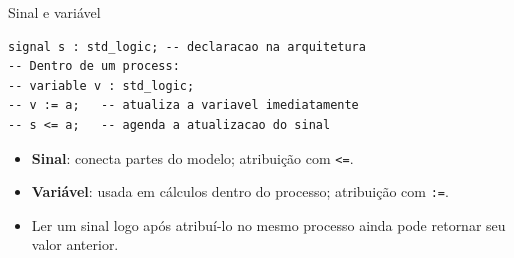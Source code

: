 \begin{frame}[fragile,t]{Sinal e variável}
\begin{lstlisting}
signal s : std_logic; -- declaracao na arquitetura
-- Dentro de um process:
-- variable v : std_logic;
-- v := a;   -- atualiza a variavel imediatamente
-- s <= a;   -- agenda a atualizacao do sinal
\end{lstlisting}\begin{itemize}
\item \textbf{Sinal}: conecta partes do modelo; atribuição com \texttt{<=}.
\item \textbf{Variável}: usada em cálculos dentro do processo; atribuição com \texttt{:=}.
\item Ler um sinal logo após atribuí-lo no mesmo processo ainda pode retornar seu valor anterior.
\end{itemize}
\end{frame}
